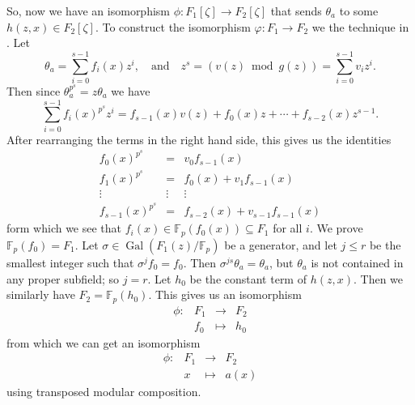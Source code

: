 \documentclass[12pt]{article}
\theoremstyle{plain}
\theoremstyle{definition}
\DeclareMathOperator{\gal}{Gal}
\def\F{\mathbb{F}}
\begin{document}
So, now we have an isomorphism $\phi: F_1[\zeta] \rightarrow F_2[\zeta]$ that sends $\theta_a$ to some $h(z, x) \in F_2[\zeta]$.
To construct the isomorphism $\varphi: F_1 \rightarrow F_2$ we the technique in \cite{Allombert2002}. Let 
\[ \theta_a = \sum_{i = 0}^{s - 1}f_i(x)z^i, \quad\text{and}\quad z^s = (v(z)  \bmod g(z)) = \sum_{i = 0}^{s - 1}v_iz^i. \] 
Then since $\theta_a^{p^s} = z\theta_a$ we have
\[ \sum_{i = 0}^{s - 1}f_i(x)^{p^s}z^i = f_{s - 1}(x)v(z) + f_0(x)z + \cdots + f_{s - 2}(x)z^{s - 1}.\]
After rearranging the terms in the right hand side, this gives us the identities
\[
\begin{array}{ccc}
f_0(x)^{p^s} & = & v_0f_{s - 1}(x) \\
f_1(x)^{p^s} & = & f_0(x) + v_1f_{s - 1}(x) \\
\vdots & \vdots & \vdots \\
f_{s - 1}(x)^{p^s} & = & f_{s - 2}(x) + v_{s - 1}f_{s - 1}(x)
\end{array} 
\]
form which we see that $f_i(x) \in \F_p(f_0(x)) \subseteq F_1$ for all $i$. We prove $\F_p(f_0) = F_1$. Let $\sigma \in
\gal(F_1(z) / \F_p)$ be a generator, and let $j \le r$ be the smallest integer such that $\sigma^jf_0 = f_0$. Then
$\sigma^{js}\theta_a = \theta_a$, but $\theta_a$ is not contained in any proper subfield; so $j = r$. Let $h_0$ be the constant
term of $h(z, x)$. Then we similarly have $F_2 = \F_p(h_0)$. This gives us an isomorphism
\[
\begin{array}{rlll}
	\phi: & F_1 & \longrightarrow & F_2 \\
	& f_0 & \longmapsto & h_0
\end{array}
\]
from which we can get an isomorphism
\[
\begin{array}{rlll}
	\phi: & F_1 & \longrightarrow & F_2 \\
	& x & \longmapsto & a(x)
\end{array}
\]
using transposed modular composition. 




\end{document}
